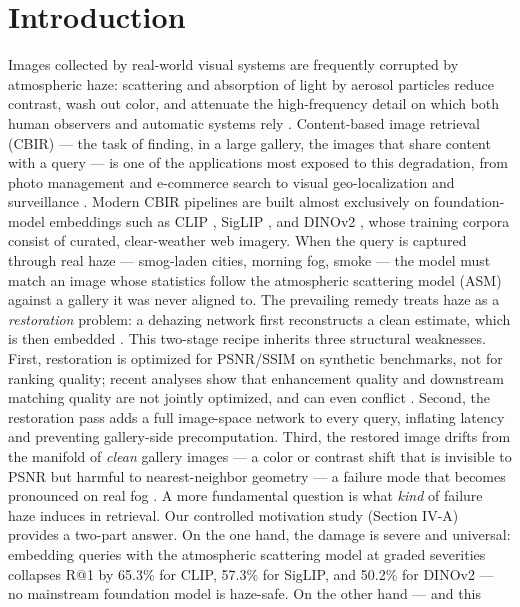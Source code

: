 \documentclass[journal]{IEEEtran}
\begin{document}
\section{Introduction}
Images collected by real-world visual systems are frequently corrupted by
atmospheric haze: scattering and absorption of light by aerosol particles
reduce contrast, wash out color, and attenuate the high-frequency detail on
which both human observers and automatic systems rely
\cite{he2010dcp,li2018reside}. Content-based image retrieval (CBIR) --- the
task of finding, in a large gallery, the images that share content with a
query --- is one of the applications most exposed to this degradation, from
photo management and e-commerce search to visual geo-localization and
surveillance \cite{wei2017scda}. Modern CBIR pipelines are built almost
exclusively on foundation-model embeddings such as CLIP \cite{radford2021clip},
SigLIP \cite{zhai2023siglip}, and DINOv2 \cite{oquab2023dinov2}, whose
training corpora consist of curated, clear-weather web imagery. When the
query is captured through real haze --- smog-laden cities, morning fog, smoke ---
the model must match an image whose statistics follow the atmospheric
scattering model (ASM) \cite{he2010dcp,li2018reside} against a gallery it was
never aligned to.
The prevailing remedy treats haze as a \emph{restoration} problem: a dehazing
network first reconstructs a clean estimate, which is then embedded
\cite{qin2020ffa,chen2024deanet,song2023dehazingformer}. This two-stage
recipe inherits three structural weaknesses. First, restoration is optimized
for PSNR/SSIM on synthetic benchmarks, not for ranking quality; recent
analyses show that enhancement quality and downstream matching quality are
not jointly optimized, and can even conflict \cite{liu2020denoising}. Second,
the restoration pass adds a full image-space network to every query,
inflating latency and preventing gallery-side precomputation. Third, the
restored image drifts from the manifold of \emph{clean} gallery images --- a color
or contrast shift that is invisible to PSNR but harmful to nearest-neighbor
geometry --- a failure mode that becomes pronounced on real fog
\cite{wang2024ucldehaze,ju2021ide}.
A more fundamental question is what \emph{kind} of failure haze induces in
retrieval. Our controlled motivation study (Section IV-A) provides a
two-part answer. On the one hand, the damage is severe and universal:
embedding queries with the atmospheric scattering model at graded severities
collapses R@1 by 65.3\% for CLIP, 57.3\% for SigLIP, and 50.2\% for DINOv2 ---
no mainstream foundation model is haze-safe. On the other hand --- and this
\end{document}
